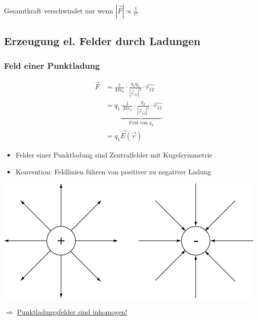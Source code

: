 \documentclass[11pt]{article}
\begin{document}
Gesamtkraft verschwindet nur wenn $|\vec{F}| \propto \frac{1}{r^2}$

\subsection{Erzeugung el. Felder durch Ladungen}

	\subsubsection{Feld einer Punktladung}
	
	\begin{align*}
		\vec{F} &= \frac{1}{4\pi\epsilon_0} \cdot \frac{q_1 q_2}{ |\vec{r}_{12}|^2 } \cdot \hat{r_{12}} \\
					&=q_1 \underbrace{ \cdot \frac{1}{4\pi\epsilon_0} \cdot \frac{q_2}{ |\vec{r}_{12}|^2 } \cdot \hat{r_{12}}  }_{\text{Feld von }q_2} \\
					&=q_1 \vec{E}(\vec{r})
	\end{align*}
	\begin{itemize}
		\item Felder einer Punktladung sind Zentralfelder mit Kugelsymmetrie
		\item Konvention: Feldlinien führen von positiver zu negativer Ladung
	\end{itemize}
	\begin{center}
		\includegraphics[width=0.7\linewidth]{skizzen/14/14_4B0}
	\end{center}

	$ \Rightarrow $ \underline{Punktladungsfelder sind inhomogen!}
	
\end{document}
